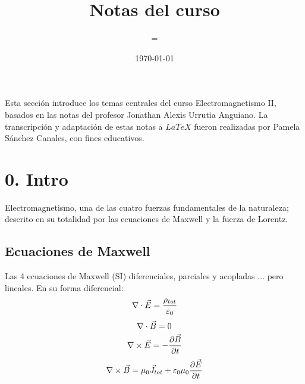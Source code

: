 \documentclass{electro}
\title{Notas del curso}
\date{\today}
\subtitle={Electromagnetismo II}
\begin{document}
	
	\pagestyle{fancy}
	\unspacedoperators
	
		\begin{center}
			\maketitle
			
			{\begin{tcolorbox}[colframe=white, colback=principaluno!45, arc=8pt]
				
	   Esta sección introduce los temas centrales del curso Electromagnetismo II, basados en las notas del profesor Jonathan Alexis Urrutia Anguiano. La transcripción y adaptación de estas notas a \(LaTeX\) fueron realizadas por Pamela Sánchez Canales, con fines educativos.

			\end{tcolorbox}}

			\smallskip
		\end{center}
	

	\saythanks
        

    
    \section*{0. Intro}
        Electromagnetismo, una de las cuatro fuerzas fundamentales de la naturaleza; descrito en su totalidad por las ecuaciones de Maxwell y la fuerza de Lorentz.
        \subsection*{Ecuaciones de Maxwell}
        Las 4 ecuaciones de Maxwell (SI) diferenciales, parciales y acopladas $\dots$ pero lineales. En su forma diferencial:
        \begin{equation}
            \nabla \cdot \vec{E} = \frac{\rho_{tot}}{\varepsilon_0}
        \label{eq:1D Maxwell}
        \end{equation}
        \begin{equation}
                \nabla \cdot \vec{B}=0
            \label{eqn:2D Maxwell}
        \end{equation}
        \begin{equation}
            \nabla \times \vec{E}=-\frac{\partial \vec{B}}{\partial t}
            \label{eqn:3D Maxwell}
        \end{equation}
        \begin{equation}
            \nabla \times \vec{B}=\mu_0 \vec{J}_{tot}+\varepsilon_0 \mu_0 \frac{\partial \vec{E}}{\partial t}
            \label{eqn:4D Maxwell}
        \end{equation}
    
\end{document}
